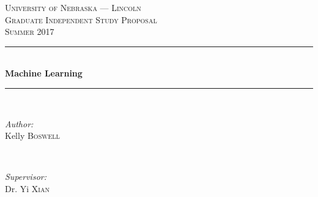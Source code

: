 \documentclass[12pt]{article}
\begin{document}
\begin{titlepage}

\newcommand{\HRule}{\rule{\linewidth}{0.5mm}} %

\center %
 

\textsc{\LARGE University of Nebraska --- Lincoln}\\[1.5cm] %
\textsc{\Large Graduate Independent Study Proposal}\\[0.5cm] %
\textsc{\large Summer 2017}\\[0.5cm] %


\HRule \\[0.4cm]
{ \huge \bfseries Machine Learning}\\[0.4cm] %
\HRule \\[1.5cm]
 

\begin{minipage}{0.4\textwidth}
\begin{flushleft} \large
\emph{Author:}\\
Kelly \textsc{Boswell} %
\end{flushleft}
\end{minipage}
~
\begin{minipage}{0.4\textwidth}
\begin{flushright} \large
\emph{Supervisor:} \\
Dr. Yi \textsc{Xian} %
\end{flushright}
\end{minipage}\\[4cm]

\end{titlepage}
\end{document}
